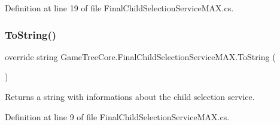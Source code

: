 Definition at line 19 of file Final\+Child\+Selection\+Service\+M\+A\+X.\+cs.

\mbox{\label{class_game_tree_core_1_1_final_child_selection_service_m_a_x_a56819f278cda4cf3a9b778cf53cca5c7}} 
\subsubsection{\texorpdfstring{To\+String()}{ToString()}}
{\footnotesize\ttfamily override string Game\+Tree\+Core.\+Final\+Child\+Selection\+Service\+M\+A\+X.\+To\+String (\begin{DoxyParamCaption}{ }\end{DoxyParamCaption})}



Returns a string with informations about the child selection service. 



Definition at line 9 of file Final\+Child\+Selection\+Service\+M\+A\+X.\+cs.

